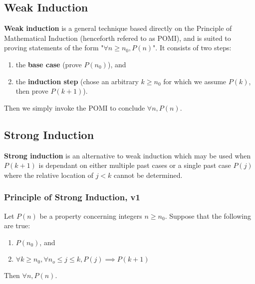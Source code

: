 \documentclass[12pt]{article}
\begin{document}
\subsection*{Weak Induction}
{\bf Weak induction} is a general technique based directly on the Principle of Mathematical Induction (henceforth refered to as POMI), and is suited to proving statements of the form "$\forall n \geq n_0, P(n)$". It consists of two steps:
\begin{enumerate}
\item the {\bf base case} (prove $P(n_0)$), and
\item the {\bf induction step} (chose an arbitrary $k \geq n_0$ for which we assume $P(k)$, then prove $P(k+1)$).
\end{enumerate}

Then we simply invoke the POMI to conclude $\forall n, P(n)$.



\subsection*{Strong Induction}
{\bf Strong induction} is an alternative to weak induction which may be used when $P(k+1)$ is dependant on either multiple past cases or a single past case $P(j)$ where the relative location of $j < k$ cannot be determined.

\subsubsection*{Principle of Strong Induction, v1}
 Let $P(n)$ be a property concerning integers $n \geq n_0$. Suppose that the following are true:
\begin{enumerate}
\item $P(n_0)$, and
\item $\forall k \geq n_0, \forall n_o \leq j \leq k, P(j) \implies P(k+1)$
\end{enumerate}
Then $\forall n, P(n)$.
\end{document}
